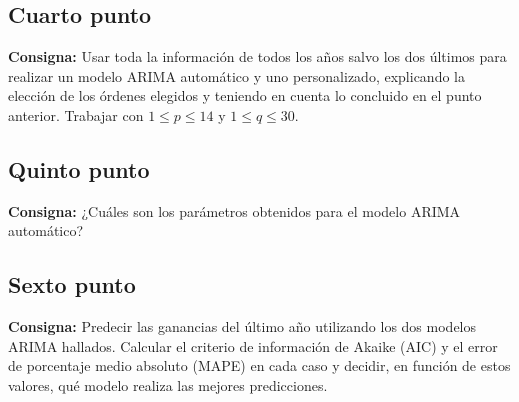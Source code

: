 \documentclass{article} %
\begin{document}
\subsection{Cuarto punto}

\textbf{Consigna:} Usar toda la información de todos los años salvo los dos últimos para realizar un modelo ARIMA automático y uno personalizado, explicando la elección de los órdenes elegidos y teniendo en cuenta lo concluido en el punto anterior. Trabajar con  $1 \leq p \leq 14$ y $1 \leq q \leq 30$.

\subsection{Quinto punto}

\textbf{Consigna:} ¿Cuáles son los parámetros obtenidos para el modelo ARIMA automático?

\subsection{Sexto punto}

\textbf{Consigna:} Predecir las ganancias del último año utilizando los dos modelos ARIMA hallados. Calcular el criterio de información de Akaike (AIC) y el error de porcentaje medio absoluto (MAPE) en cada caso y decidir, en función de estos valores, qué modelo realiza las mejores predicciones.
\end{document}
